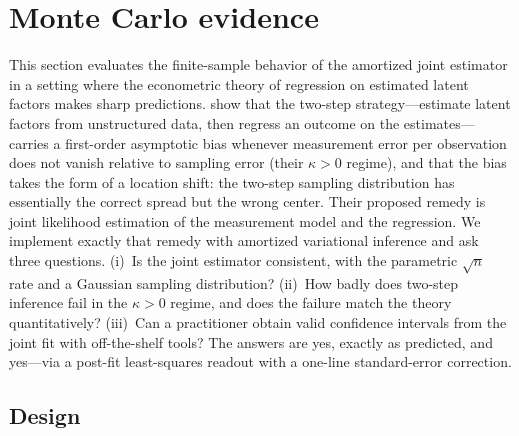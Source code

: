 
\section{Monte Carlo evidence}
\label{sec:simulations}

This section evaluates the finite-sample behavior of the amortized joint
estimator in a setting where the econometric theory of regression on
estimated latent factors makes sharp predictions.
\citet{BattagliaEtAl2025} show that the two-step strategy---estimate latent
factors from unstructured data, then regress an outcome on the
estimates---carries a first-order asymptotic bias whenever measurement error
per observation does not vanish relative to sampling error (their
$\kappa>0$ regime), and that the bias takes the form of a location shift:
the two-step sampling distribution has essentially the correct spread but
the wrong center.  Their proposed remedy is joint likelihood estimation of
the measurement model and the regression.  We implement exactly that remedy
with amortized variational inference and ask three questions.  (i)~Is the
joint estimator consistent, with the parametric $\sqrt{n}$ rate and a
Gaussian sampling distribution?  (ii)~How badly does two-step inference fail
in the $\kappa>0$ regime, and does the failure match the theory
quantitatively?  (iii)~Can a practitioner obtain valid confidence intervals
from the joint fit with off-the-shelf tools?  The answers are yes, exactly
as predicted, and yes---via a post-fit least-squares readout with a one-line
standard-error correction.

\subsection{Design}
\label{sec:sim-design}

